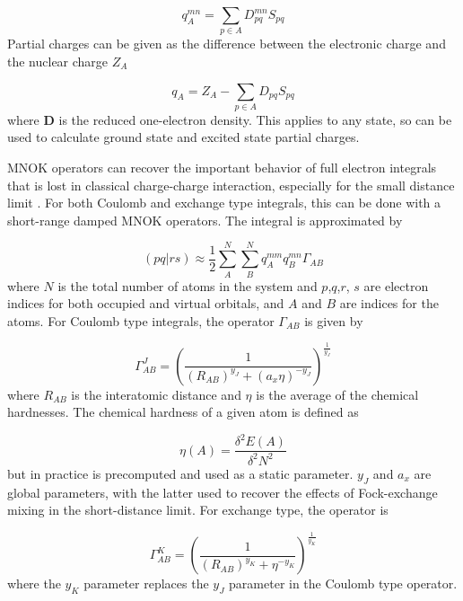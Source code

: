 \begin{equation}
q^{mn}_A = \sum_{p \in A} D^{mn}_{pq} S_{pq}  
\end{equation}
%
Partial charges can be given as the difference between the electronic charge
and the nuclear charge $Z_A$

\begin{equation}
q_A = Z_A - \sum_{p \in A} D_{pq} S_{pq}  
\end{equation}
%
where $\mathbf{D}$ is the reduced one-electron density. This applies to any state,
so can be used to calculate ground state and excited state partial charges.

MNOK operators can recover the important behavior of full electron integrals that
is lost in classical charge-charge interaction, especially for the small distance limit \cite{Grimme2016}.
For both Coulomb and exchange type integrals, this can be done with a short-range
damped MNOK operators. The integral is approximated by

\begin{equation}
\left(pq|rs\right) \approx \frac{1}{2}\sum^N_A \sum^N_B q_A^{mm} q_B^{mn} \Gamma_{AB}
\end{equation}
%
where $N$ is the total number of atoms in the system and $p$,$q$,$r$, $s$ are electron
indices for both occupied and virtual orbitals, and $A$ and $B$ are indices for
 the atoms. For Coulomb type integrals, the operator $\Gamma_{AB}$ is given by

\begin{equation}
\Gamma^J_{AB} = \left(\frac{1}{\left(R_{AB}\right)^{y_J} + \left(a_x \eta\right)^{-y_J}} \right)^{\frac{1}{y_J}}
\label{eq:gammaJ}
\end{equation}
%
where $R_{AB}$ is the interatomic distance and $\eta$ is the average of the chemical 
hardnesses. The chemical hardness of a given atom is defined as

\begin{equation}
\eta\left(A\right) = \frac{\delta^2 E\left(A\right)}{\delta^2 N^2}
\end{equation}
%
but in practice is precomputed and used as a static parameter. $y_J$ and $a_x$ are
global parameters, with the latter used to recover the effects of Fock-exchange
mixing in the short-distance limit. For exchange type, the operator is

\begin{equation}
\Gamma^K_{AB} = \left(\frac{1}{\left(R_{AB}\right)^{y_K} + \eta^{-y_K}} \right)^{\frac{1}{y_K}}
\label{eq:gammaK}
\end{equation}
%
where the $y_K$ parameter replaces the $y_J$ parameter in the Coulomb type operator.

